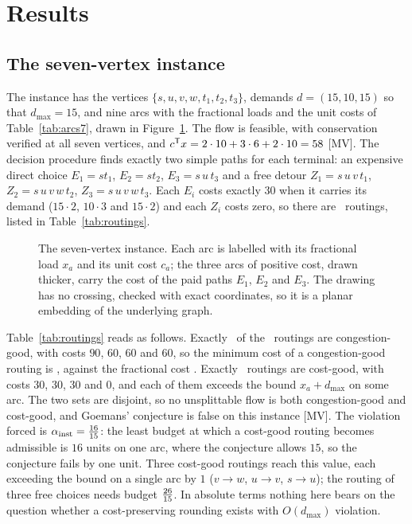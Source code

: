 \documentclass[11pt]{article}
\theoremstyle{remark}
\newcommand{\dmax}{d_{\max}}
\begin{document}
\section{Results}
\label{sec:results}

\subsection{The seven-vertex instance}
\label{sec:seven}

The instance has the vertices $\{s,u,v,w,t_1,t_2,t_3\}$, demands $d=(15,10,15)$ so that $\dmax=15$, and nine arcs with the fractional loads and the unit costs of Table~\ref{tab:arcs7}, drawn in Figure~\ref{fig:instance}.
The flow is feasible, with conservation verified at all seven vertices, and $c^{\mathsf T}x=2\cdot10+3\cdot6+2\cdot10=58$ [MV]. The decision procedure finds exactly two simple paths for each terminal: an expensive direct choice
$E_1=st_1$, $E_2=st_2$, $E_3=s\,u\,t_3$ and a free detour $Z_1=s\,u\,v\,t_1$, $Z_2=s\,u\,v\,w\,t_2$, $Z_3=s\,u\,v\,w\,t_3$. Each $E_i$ costs exactly 30 when it carries its demand ($15\cdot2$, $10\cdot3$ and $15\cdot2$) and each $Z_i$ costs zero, so there are
\nroutings\ routings, listed in Table~\ref{tab:routings}.



\begin{figure}[t]
\centering

\caption{The seven-vertex instance. Each arc is labelled with its fractional load $x_a$ and its unit cost $c_a$; the three arcs of positive cost, drawn thicker, carry the cost of the paid paths $E_1$, $E_2$ and $E_3$.
The drawing has no crossing, checked with exact coordinates, so it is a planar embedding of the underlying graph.}
\label{fig:instance}
\end{figure}

Table~\ref{tab:routings} reads as follows. Exactly \ngood\ of the \nroutings\ routings are congestion-good, with costs $90$, $60$, $60$ and $60$, so the minimum cost of a congestion-good routing is \nmingood, against the fractional cost
\nfraccost. Exactly \ncostgood\ routings are cost-good, with costs $30$, $30$, $30$ and $0$, and each of them exceeds the bound $x_a+\dmax$ on some arc. The two sets are disjoint, so no unsplittable flow is both congestion-good and cost-good, and Goemans' conjecture is false on this
instance [MV]. The violation forced is $\alpha_{\mathrm{inst}}=\tfrac{16}{15}$: the least budget at which a cost-good routing becomes admissible is $16$ units on one arc, where the conjecture allows $15$, so the conjecture fails by one unit. Three cost-good routings reach this value, each exceeding the
bound on a single arc by $1$ ($v\to w$, $u\to v$, $s\to u$); the routing of three free choices needs budget $\tfrac{26}{15}$. In absolute terms nothing here bears on the question whether a cost-preserving rounding exists with $O(\dmax)$ violation.
\end{document}
